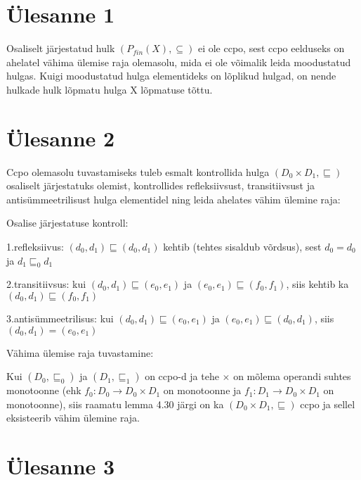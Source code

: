 \section{Ülesanne 1}

Osaliselt järjestatud hulk \( (P_{fin}(X), \subseteq) \) ei ole ccpo, sest ccpo
eelduseks on ahelatel vähima ülemise raja olemasolu, mida ei ole võimalik leida
moodustatud hulgas. Kuigi moodustatud hulga elementideks on lõplikud hulgad, on
nende hulkade hulk lõpmatu hulga X lõpmatuse tõttu.

\section{Ülesanne 2}

Ccpo olemasolu tuvastamiseks tuleb esmalt kontrollida hulga \((D_0 \times D_1,
\sqsubseteq )\) osaliselt järjestatuks olemist, kontrollides refleksiivsust,
transitiivsust ja antisümmeetrilisust hulga elementidel ning leida ahelates
vähim ülemine raja:

Osalise järjestatuse kontroll:

1.refleksiivus: \((d_0, d_1) \sqsubseteq (d_0, d_1)\) kehtib (tehtes sisaldub
võrdsus), sest \(d_0 = d_0\) ja \(d_1 \sqsubseteq_0 d_1 \)

2.transitiivsus: kui \((d_0, d_1) \sqsubseteq (e_0, e_1)\) ja \((e_0, e_1)
\sqsubseteq (f_0, f_1)\), siis kehtib ka \((d_0, d_1) \sqsubseteq (f_0, f_1)\)

3.antisümmeetrilisus: kui \((d_0, d_1) \sqsubseteq (e_0, e_1)\) ja \((e_0, e_1)
\sqsubseteq (d_0, d_1)\), siis \((d_0, d_1) = (e_0, e_1)\)

Vähima ülemise raja tuvastamine:

Kui \((D_0, \sqsubseteq_0)\) ja \((D_1, \sqsubseteq_1)\) on ccpo-d ja tehe
\(\times\) on mõlema operandi suhtes monotoonne (ehk \(f_0:D_0 \rightarrow D_0
\times D_1\) on monotoonne ja \(f_1:D_1 \rightarrow D_0 \times D_1\) on
monotoonne), siis raamatu lemma 4.30 järgi on ka \((D_0 \times D_1,
\sqsubseteq)\) ccpo ja sellel eksisteerib vähim ülemine raja.

\section{Ülesanne 3}

